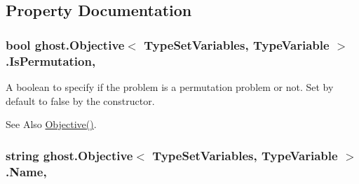 \subsection{Property Documentation}
\hypertarget{classghost_1_1Objective_3_01TypeSetVariables_00_01TypeVariable_01_4_ae27cf3769e4705f74e22a32604982375}{
\subsubsection[{Is\-Permutation}]{\setlength{\rightskip}{0pt plus 5cm}bool ghost.\-Objective$<$ Type\-Set\-Variables, Type\-Variable $>$.Is\-Permutation\hspace{0.3cm}{\ttfamily [get]}, {\ttfamily [set]}}}\label{classghost_1_1Objective_3_01TypeSetVariables_00_01TypeVariable_01_4_ae27cf3769e4705f74e22a32604982375}
A boolean to specify if the problem is a permutation problem or not. Set by default to false by the constructor. \begin{DoxySeeAlso}{See Also}
\hyperlink{classghost_1_1Objective_3_01TypeSetVariables_00_01TypeVariable_01_4_a036b0e1d3b3678f38f5080a1a32e27f4}{Objective()}. 
\end{DoxySeeAlso}
\hypertarget{classghost_1_1Objective_3_01TypeSetVariables_00_01TypeVariable_01_4_a7613aecfe171eb9aa6f3b77ccdbe49be}{
\subsubsection[{Name}]{\setlength{\rightskip}{0pt plus 5cm}string ghost.\-Objective$<$ Type\-Set\-Variables, Type\-Variable $>$.Name\hspace{0.3cm}{\ttfamily [get]}, {\ttfamily [set]}}}\label{classghost_1_1Objective_3_01TypeSetVariables_00_01TypeVariable_01_4_a7613aecfe171eb9aa6f3b77ccdbe49be}
